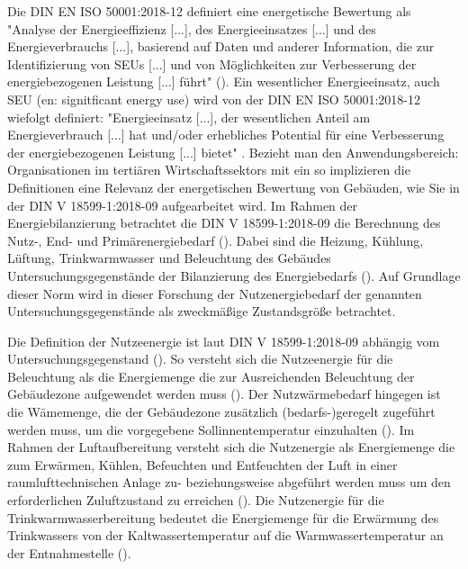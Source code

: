 Die DIN EN ISO 50001:2018-12 definiert eine energetische Bewertung als "Analyse der Energieeffizienz [...], des Energieeinsatzes [...] und des Energieverbrauchs [...], basierend 
auf Daten und anderer Information, die zur Identifizierung von SEUs [...] und von Möglichkeiten zur Verbesserung der energiebezogenen Leistung [...] führt" (\cite[Kapitel 3.5.5]{DIN50001.2018}).
Ein wesentlicher Energieeinsatz, auch SEU (en: signitficant energy use) wird von der DIN EN ISO 50001:2018-12 wiefolgt definiert: "Energieeinsatz [...], der wesentlichen Anteil am 
Energieverbrauch [...] hat und/oder erhebliches Potential für eine Verbesserung der energiebezogenen Leistung [...] bietet" \cite[Kapitel 3.5.6]{DIN50001.2018}.
Bezieht man den Anwendungsbereich: Organisationen im tertiären Wirtschaftssektors mit ein so implizieren die Definitionen eine Relevanz der energetischen Bewertung von 
Gebäuden, wie Sie in der DIN V 18599-1:2018-09 aufgearbeitet wird.
Im Rahmen der Energiebilanzierung betrachtet die DIN V 18599-1:2018-09 die Berechnung des Nutz-, End- und Primärenergiebedarf (\cite{DIN18599.2018}). 
Dabei sind die Heizung, Kühlung, Lüftung, Trinkwarmwasser und Beleuchtung des Gebäudes Untersuchungsgegenstände der Bilanzierung des Energiebedarfs (\cite{DIN18599.2018}). 
Auf Grundlage dieser Norm wird in dieser Forschung der Nutzenergiebedarf der genannten Untersuchungsgegenstände als zweckmäßige 
Zustandsgröße betrachtet. %

Die Definition der Nutzeenergie ist laut DIN V 18599-1:2018-09 abhängig vom Untersuchungsgegenstand (\cite[Kapitel 5.3.1]{DIN18599.2018}).
So versteht sich die Nutzeenergie für die Beleuchtung als die Energiemenge die zur Ausreichenden Beleuchtung der Gebäudezone aufgewendet werden muss (\cite[Kapitel 5.3.1]{DIN18599.2018}).
Der Nutzwärmebedarf hingegen ist die Wämemenge, die der Gebäudezone zusätzlich (bedarfs-)geregelt zugeführt werden muss, um die vorgegebene 
Sollinnentemperatur einzuhalten (\cite[Kapitel 5.3.1]{DIN18599.2018}).
Im Rahmen der Luftaufbereitung versteht sich die Nutzenergie als Energiemenge die zum Erwärmen, Kühlen, Befeuchten und Entfeuchten der Luft in einer 
raumlufttechnischen Anlage zu- beziehungsweise abgeführt werden muss um den erforderlichen Zuluftzustand zu erreichen (\cite[Kapitel 5.3.1]{DIN18599.2018}).
Die Nutzenergie für die Trinkwarmwasserbereitung bedeutet die Energiemenge für die Erwärmung des Trinkwassers von der Kaltwassertemperatur auf die 
Warmwassertemperatur an der Entnahmestelle (\cite[Kapitel 5.3.1]{DIN18599.2018}).

